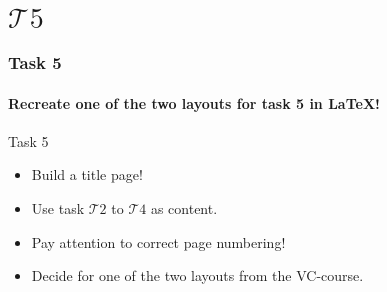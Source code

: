 \section{$\mathcal{T}5$}

\begin{frame}
\frametitle{Task 5}
\framesubtitle{Recreate one of the two layouts for task 5 in \LaTeX !}

\begin{block}{Task 5}
\begin{itemize}
\item Build a title page!%
\item Use task $\mathcal{T}2$ to $\mathcal{T}4$ as content.%
\item Pay attention to correct page numbering!%
\item Decide for one of the two layouts from the VC-course.%
\end{itemize}
\end{block}
\end{frame}